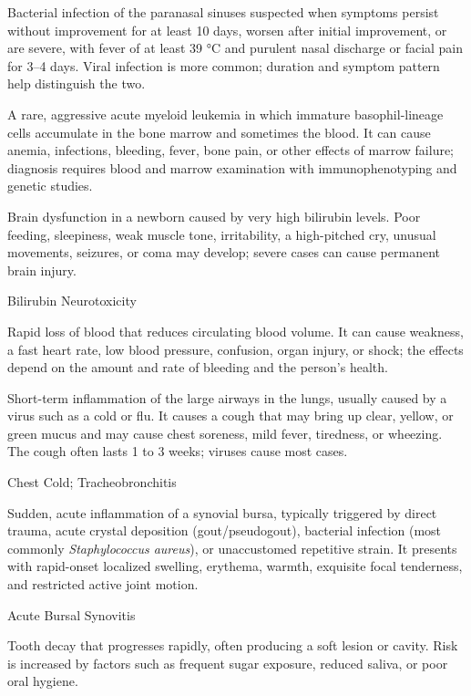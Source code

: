  Bacterial infection of the paranasal sinuses suspected when symptoms persist without improvement for at least 10 days, worsen after initial improvement, or are severe, with fever of at least 39 °C and purulent nasal discharge or facial pain for 3–4 days. Viral infection is more common; duration and symptom pattern help distinguish the two.

 A rare, aggressive acute myeloid leukemia in which immature basophil-lineage cells accumulate in the bone marrow and sometimes the blood. It can cause anemia, infections, bleeding, fever, bone pain, or other effects of marrow failure; diagnosis requires blood and marrow examination with immunophenotyping and genetic studies.

 Brain dysfunction in a newborn caused by very high bilirubin levels. Poor feeding, sleepiness, weak muscle tone, irritability, a high-pitched cry, unusual movements, seizures, or coma may develop; severe cases can cause permanent brain injury.

\synonyms
Bilirubin Neurotoxicity

 Rapid loss of blood that reduces circulating blood volume. It can cause weakness, a fast heart rate, low blood pressure, confusion, organ injury, or shock; the effects depend on the amount and rate of bleeding and the person’s health.

 Short-term inflammation of the large airways in the lungs, usually caused by a virus such as a cold or flu. It causes a cough that may bring up clear, yellow, or green mucus and may cause chest soreness, mild fever, tiredness, or wheezing. The cough often lasts 1 to 3 weeks; viruses cause most cases.

\synonyms
Chest Cold; Tracheobronchitis

 Sudden, acute inflammation of a synovial bursa, typically triggered by direct trauma, acute crystal deposition (gout/pseudogout), bacterial infection (most commonly \textit{Staphylococcus aureus}), or unaccustomed repetitive strain. It presents with rapid-onset localized swelling, erythema, warmth, exquisite focal tenderness, and restricted active joint motion.

\synonyms
Acute Bursal Synovitis

 Tooth decay that progresses rapidly, often producing a soft lesion or cavity. Risk is increased by factors such as frequent
sugar exposure, reduced saliva, or poor oral hygiene.

